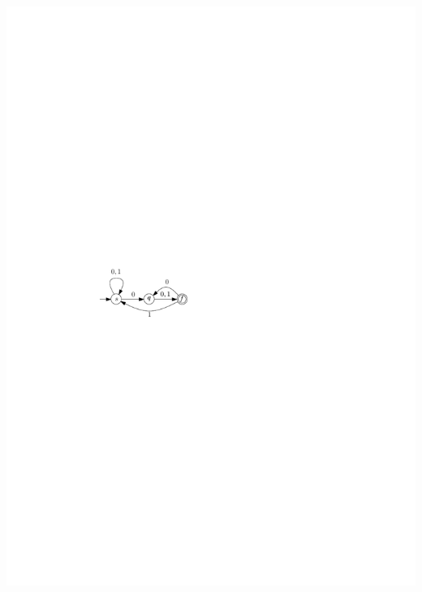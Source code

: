 \begin{frame}
\begin{minipage}{0.5 \textwidth}
	\end{minipage}
	\hfill
    \begin{minipage}{0.45 \textwidth}        
        \begin{center}
        	\includegraphics[scale=1]{images/beispielNEA.pdf}
        \end{center}
    \end{minipage}
\end{frame}
